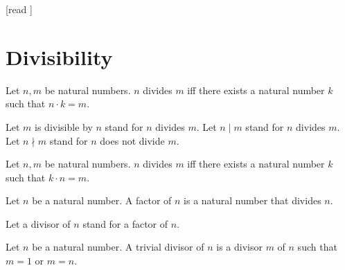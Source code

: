 \documentclass[10pt]{article}
\begin{document}
  \begin{imports}
    \begin{forthel}
      [read ]
    \end{forthel}
  \end{imports}


  \section*{Divisibility}

  \begin{forthel}
    \begin{definition}[id=ARITHMETIC_07_4239998993825792,printid]
      Let $n, m$ be natural numbers.
      $n$ divides $m$ iff there exists a natural number $k$ such that $n \cdot k = m$.
    \end{definition}

    Let $m$ is divisible by $n$ stand for $n$ divides $m$.
    Let $n \mid m$ stand for $n$ divides $m$.
    Let $n \nmid m$ stand for $n$ does not divide $m$.
  \end{forthel}

  \begin{forthel}
    \begin{lemma}[id=ARITHMETIC_07_1478855118290944,printid]
      Let $n, m$ be natural numbers.
      $n$ divides $m$ iff there exists a natural number $k$ such that $k \cdot n = m$.
    \end{lemma}
  \end{forthel}

  \begin{forthel}
    \begin{definition}[id=ARITHMETIC_07_1311437490225152,printid]
      Let $n$ be a natural number.
      A factor of $n$ is a natural number that divides $n$.
    \end{definition}

    Let a divisor of $n$ stand for a factor of $n$.
  \end{forthel}

  \begin{forthel}
    \begin{definition}[id=ARITHMETIC_10_5438991513944064,printid]
      Let $n$ be a natural number.
      A trivial divisor of $n$ is a divisor $m$ of $n$ such that $m = 1$ or $m = n$.
    \end{definition}
  \end{forthel}
\end{document}
